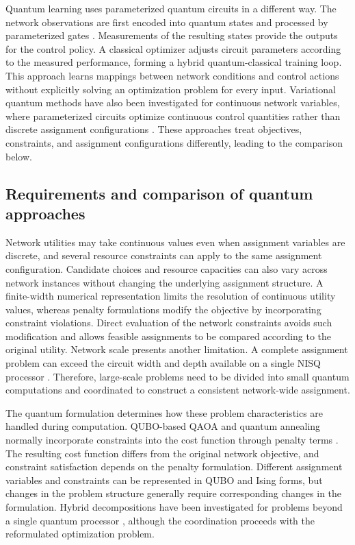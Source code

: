 \documentclass[journal]{IEEEtran}
\begin{document}
{Quantum learning uses parameterized quantum circuits in a different way. The network observations are first encoded into quantum states and processed by parameterized gates \cite{biamonte2017,narottama2022qnn,ansere2024qdrl}. Measurements of the resulting states provide the outputs for the control policy. A classical optimizer adjusts circuit parameters according to the measured performance, forming a hybrid quantum-classical training loop. This approach learns mappings between network conditions and control actions without explicitly solving an optimization problem for every input. Variational quantum methods have also been investigated for continuous network variables, where parameterized circuits optimize continuous control quantities rather than discrete assignment configurations \cite{zhang2024beamforming,sharma2026tnse}.
These approaches treat objectives, constraints, and assignment configurations
differently, leading to the comparison below.


\subsection{Requirements and comparison of quantum approaches}
\label{sec:bg-comparison}

Network utilities may take continuous values even when assignment variables are discrete, and several resource constraints can apply to the same assignment configuration. Candidate choices and resource capacities can also vary across network instances without changing the underlying assignment structure. 
A finite-width numerical representation limits the resolution of continuous utility values, whereas penalty formulations modify the objective by incorporating constraint violations. Direct evaluation of the network constraints avoids such modification and allows feasible assignments to be compared according to the original utility. Network scale presents another limitation. A complete assignment problem can exceed the circuit width and depth available on a single NISQ processor \cite{18,23}. Therefore, large-scale problems need to be divided into small quantum computations and coordinated to construct a consistent network-wide assignment.

The quantum formulation determines how these problem characteristics are handled during computation.
QUBO-based QAOA and quantum annealing normally incorporate constraints into the cost function through penalty terms \cite{farhi2014,lucas2014,zhang2024tnse,wei2024tnse}. The resulting cost function differs from the original network objective, and constraint satisfaction depends on the penalty formulation. 
Different assignment variables and constraints can be represented in QUBO and Ising forms, but
changes in the problem structure generally require corresponding changes in the formulation. Hybrid decompositions have been investigated for problems beyond a single quantum processor \cite{zhang2024tnse,wei2024tnse}, although the coordination proceeds with the reformulated optimization problem.

}
\end{document}
